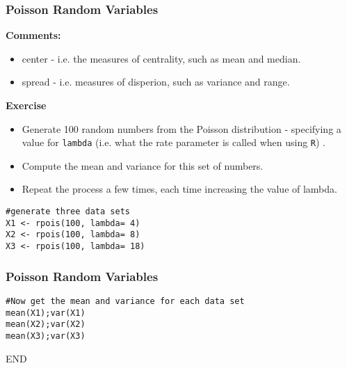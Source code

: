 \documentclass{beamer}
\begin{document}
\begin{frame}
\frametitle{Poisson Random Variables}
\vspace{0.5cm}
\Large
\noindent \textbf{Comments:}
\begin{itemize}
\item center - i.e. the measures of centrality, such as mean and median.
\item spread - i.e. measures of disperion, such as variance and range.
\end{itemize} 
\end{frame}
\begin{frame}[fragile] 
\textbf{Exercise}
\begin{itemize}
\item Generate 100 random numbers from the Poisson distribution - specifying a value for \texttt{lambda} (i.e. what the rate parameter is called when using \texttt{R}) .
\item Compute the mean and variance for this set of numbers.
\item Repeat the process a few times, each time increasing the value of lambda.
\end{itemize}
\begin{framed}
\begin{verbatim}
#generate three data sets
X1 <- rpois(100, lambda= 4)
X2 <- rpois(100, lambda= 8)
X3 <- rpois(100, lambda= 18)
\end{verbatim}
\end{framed}
\end{frame}
\begin{frame}[fragile]
\frametitle{Poisson Random Variables}
\begin{framed}
\begin{verbatim}
#Now get the mean and variance for each data set
mean(X1);var(X1)
mean(X2);var(X2)
mean(X3);var(X3)
\end{verbatim}
\end{framed}
\end{frame}
\begin{frame}
END
\end{frame}
\end{document}
